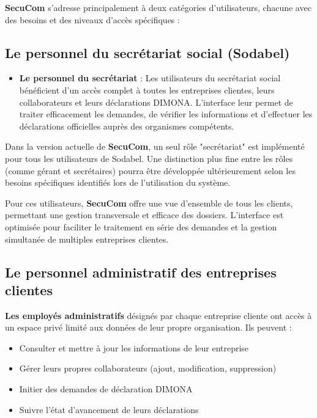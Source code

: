 \textbf{SecuCom} s'adresse principalement à deux catégories d'utilisateurs, chacune avec des besoins et des niveaux d'accès spécifiques :

\subsection{Le personnel du secrétariat social (Sodabel)}

\begin{itemize}[leftmargin=*,label=\textcolor{darkgray}{$\bullet$},itemsep=0.3em]
  \item \textbf{Le personnel du secrétariat} : Les utilisateurs du secrétariat social bénéficient d'un accès complet à toutes les entreprises clientes, leurs collaborateurs et leurs déclarations DIMONA. L'interface leur permet de traiter efficacement les demandes, de vérifier les informations et d'effectuer les déclarations officielles auprès des organismes compétents.
\end{itemize}

\begin{note}
Dans la version actuelle de \textbf{SecuCom}, un seul rôle "secrétariat" est implémenté pour tous les utilisateurs de Sodabel. Une distinction plus fine entre les rôles (comme gérant et secrétaires) pourra être développée ultérieurement selon les besoins spécifiques identifiés lors de l'utilisation du système.
\end{note}

\vspace{0.5cm}

\noindent Pour ces utilisateurs, \textbf{SecuCom} offre une vue d'ensemble de tous les clients, permettant une gestion transversale et efficace des dossiers. L'interface est optimisée pour faciliter le traitement en série des demandes et la gestion simultanée de multiples entreprises clientes.

\subsection{Le personnel administratif des entreprises clientes}

\textbf{Les employés administratifs} désignés par chaque entreprise cliente ont accès à un espace privé limité aux données de leur propre organisation. Ils peuvent :
\begin{itemize}[leftmargin=*,label=\textcolor{darkgray}{$\bullet$},itemsep=0.3em]
  \item Consulter et mettre à jour les informations de leur entreprise
  \item Gérer leurs propres collaborateurs (ajout, modification, suppression)
  \item Initier des demandes de déclaration DIMONA
  \item Suivre l'état d'avancement de leurs déclarations
\end{itemize}

